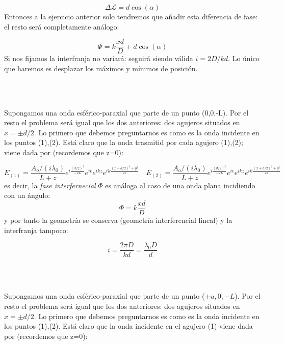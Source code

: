 \documentclass[12pt,a4paper]{book}
\numberwithin{equation}{section}
\numberwithin{figure}{section}
\newcommand{\1}{_{(1)}}
\newcommand{\2}{_{(2)}}
\theoremstyle{definition}
\begin{document}
\begin{equation}
\Delta \mathcal{L} = d \cos (\alpha)
\end{equation}
Entonces a la ejercicio anterior solo tendremos que añadir esta diferencia de fase: el resto será completamente análogo:

\begin{equation}
\Phi = k \frac{xd}{D} +  d \cos (\alpha)
\end{equation}
Si nos fijamos la interfranja no variará: seguirá siendo válida $i=2D/kd$. Lo único que haremos es desplazar los máximos y mínimos de posición.

\hrulefill \\


 \\

\hrulefill

Supongamos una onda esférico-paraxial que parte de un punto (0,0,-L). Por el resto el problema será igual que los dos anteriores: dos agujeros situados en $x=\pm d/2$. Lo primero que debemos preguntarnos es como es la onda incidente en los puntos (1),(2). Está claro que la onda trasmitid por cada agujero (1),(2); viene dada por (recordemos que z=0):


$$  E\1 = \frac{A_{o} / (i \lambda_0)}{L+z} e^{i\frac{(d/2)^2}{-2L}} e^{i \epsilon} e^{ikz} e^{ik\frac{(x - d/2)^2+y^2}{2z}} \quad
E\2 = \frac{A_{o} / (i \lambda_0)}{L+z} e^{i\frac{(d/2)^2}{-2L}} e^{i \epsilon} e^{ikz} e^{ik\frac{(x + d/2)^2+y^2}{2z}} $$
es decir, la \textit{fase interfernecial} $\Phi$ es análoga al caso de una onda plana incidiendo con un ángulo:
$$ \Phi = k \frac{xd}{D} $$
y por tanto la geometría se conserva (geometría interferencial lineal) y la interfranja tampoco:

$$ i = \frac{2 \pi D}{kd} = \dfrac{\lambda_0 D}{d} $$
 

\hrulefill \\

 \\

\hrulefill 

Supongamos una onda esférico-paraxial que parte de un punto ($\pm u,0,-L$). Por el resto el problema será igual que los dos anteriores: dos agujeros situados en $x=\pm d/2$. Lo primero que debemos preguntarnos es como es la onda incidente en los puntos (1),(2). Está claro que la onda incidente en el agujero (1) viene dada por (recordemos que z=0):
\end{document}
